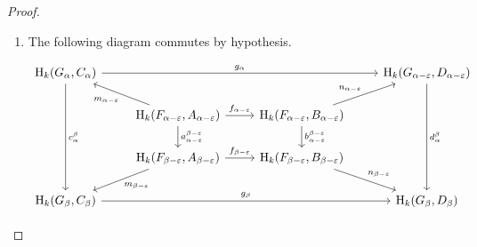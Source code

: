 \begin{proof}
\begin{enumerate}[label=\Roman*.]
    The proof is the same as the above.
    Because $\im~\nu_{\alpha-\e}$ is a subspace of $\im~f_\alpha$ and $\im~\phi_\alpha^\beta = \im~b_\alpha^\beta\circ f_\alpha$,
    \[ \im~\phi_\alpha^\beta\circ \nu_{\alpha-\e} = \im~b_\alpha^\beta\circ f_\alpha\circ u_{\alpha-e},\]
    which is a subspact of $\im~f_\beta$.
    As $\im~\mu_\beta = \im~n_\beta\circ f_\beta$ it follows that
    \begin{align*}
      \im~\mu_\beta\circ \phi_\alpha^\beta\circ\nu_{\alpha-\e} &= \im~n_\beta\circ b_\alpha^\beta\circ f_\alpha\circ u_{\alpha-e}\\
        &= \im~d_{\alpha-\e}^{\beta+\e}\circ f_{\alpha-\e}\\
        &= \im~\psi_{\alpha-\e}^{\beta+\e}.
    \end{align*}
    So Diagram~\ref{dgm:intr2} commutes.

    \item The following diagram commutes by hypothesis.

    \begin{equation}\label{dgm:intr2a}\begin{tikzcd}
      |[alias=Aa]|\hom_k(G_{\alpha}, C_{\alpha})  \arrow[to=Ba, "g_{\alpha}"]
                                      \arrow[to=Ab, "c_{\alpha}^{\beta}"]
      & & & |[alias=Ba]|
        \hom_k(G_{\alpha - \e}, D_{\alpha-\e})  \arrow[to=Bb, "d_{\alpha}^{\beta}"] \\
      & |[alias=Ca]|
      \hom_k(F_{\alpha-\e}, A_{\alpha-\e})  \arrow[to=Aa, "m_{\alpha-\e}"]
                                  \arrow[to=Da, "f_{\alpha-\e}"]
                                  \arrow[to=Cb, "a_{\alpha-\e}^{\beta-\e}"]
      & |[alias=Da]|
        \hom_k(F_{\alpha-\e}, B_{\alpha-\e})  \arrow[to=Ba, "n_{\alpha-\e}"]
                                    \arrow[to=Db, "b_{\alpha-\e}^{\beta-\e}"] & \\
      & |[alias=Cb]|
      \hom_k(F_{\beta-\e}, A_{\beta-\e})  \arrow[to=Ab, "m_{\beta-\e}"]
                                          \arrow[to=Db, "f_{\beta-\e}"]
      & |[alias=Db]|
        \hom_k(F_{\beta-\e}, B_{\beta-\e})  \arrow[to=Bb, "n_{\beta-\e}"] & \\
      |[alias=Ab]|
      \hom_k(G_{\beta}, C_{\beta}) \arrow[to=Bb, "g_{\beta}"]
      & & & |[alias=Bb]|
        \hom_k(G_{\beta}, D_{\beta})
    \end{tikzcd}\end{equation}


\end{enumerate}
\end{proof}
